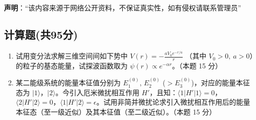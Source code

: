 
\textbf{声明}：“该内容来源于网络公开资料，不保证真实性，如有侵权请联系管理员”

\subsection{计算题(共95分)}
\begin{enumerate}
\item 试用变分法求解三维空间间如下势中 $V(r) = -\frac{aV_0 e^{-r/a}}{r}$ （其中 $V_0 > 0, \ a > 0$）的粒子的基态能量，试探波函数取为 $\psi(r) \propto e^{-\alpha r}$。（本题 15 分）
\item 某二能级系统的能量本征值分别为 $E_1^{(0)}$, $E_2^{(0)}$ ($ > E_3^{(0)}$)，对应的能量本征态为 $|1\rangle$，$|2\rangle$。今引入厄米微扰相互作用 $H'$，且知：$\langle 1|H'|1\rangle = 0$，$\langle 2|H'|2\rangle = 0$，$\langle 1|H'|2\rangle = \epsilon$。试用非简并微扰论求引入微扰相互作用后的能量本征态（至一级近似）及其本征值（至二级近似）。（本题 15 分）

\end{enumerate}
